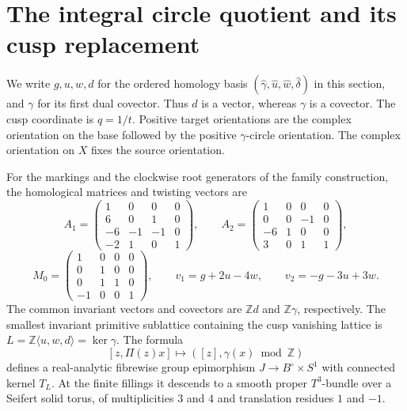 \section{The integral circle quotient and its cusp replacement}\label{mapsI:circle-quotient}

We write $g,u,w,d$ for the ordered homology basis
$(\widehat\gamma,\widehat u,\widehat w,\widehat\delta)$ in this
section, and $\gamma$ for its first dual covector.  Thus $d$ is a
vector, whereas $\gamma$ is a covector.  The cusp coordinate is
$q=1/t$.  Positive target orientations are the complex orientation
on the base followed by the positive $\gamma$-circle orientation.
The complex orientation on $X$ fixes the source orientation.

\begin{proposition}\label{mapsI:src:A.1.1}
For the markings and the clockwise root generators of the family construction,
the homological matrices and twisting vectors are
\[
 A_1=\begin{pmatrix}1&0&0&0\\6&0&1&0\\-6&-1&-1&0\\-2&1&0&1\end{pmatrix},
 \qquad
 A_2=\begin{pmatrix}1&0&0&0\\0&0&-1&0\\-6&1&0&0\\3&0&1&1\end{pmatrix},
\]
\[
 M_0=\begin{pmatrix}1&0&0&0\\0&1&0&0\\0&1&1&0\\-1&0&0&1\end{pmatrix},
 \qquad v_1=g+2u-4w,\qquad v_2=-g-3u+3w.
\]
The common invariant vectors and covectors are $\mathbb Zd$ and
$\mathbb Z\gamma$, respectively.  The smallest invariant primitive
sublattice containing the cusp vanishing lattice is
$L=\mathbb Z\langle u,w,d\rangle=\ker\gamma$.
The formula
\[
 [z,\Pi(z)x]\longmapsto([z],\gamma(x)\bmod\mathbb Z)
 \label{mapsI:quotient-eq-1}
\]
defines a real-analytic fibrewise group epimorphism
$J\longrightarrow B^\circ\times S^1$ with connected kernel $T_L$.
At the finite fillings it descends to a smooth proper $T^3$-bundle
over a Seifert solid torus, of multiplicities $3$ and $4$ and
translation residues $1$ and $-1$.
\end{proposition}

